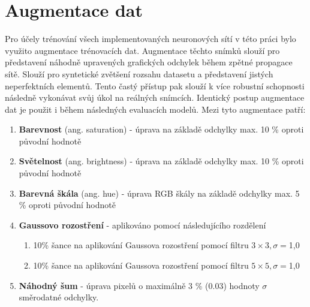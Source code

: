 \section{Augmentace dat}
\label{sec:Chapter41}
Pro účely trénování všech implementovaných neuronových sítí v této práci bylo využito augmentace trénovacích dat. Augmentace těchto snímků slouží pro představení náhodně upravených grafických odchylek během zpětné propagace sítě. Slouží pro syntetické zvětšení rozsahu datasetu a představení jistých neperfektních elementů. Tento častý přístup pak slouží k více robustní schopnosti následně vykonávat svůj úkol na reálných snímcích. Identický postup augmentace dat je použit i během následných evaluacích modelů. Mezi tyto augmentace patří:
\begin{enumerate}
  \item \textbf{Barevnost} (ang. saturation) - úprava na základě odchylky max. 10 \% oproti původní hodnotě
  \item \textbf{Světelnost} (ang. brightness) - úprava na základě odchylky max. 10 \% oproti původní hodnotě
  \item \textbf{Barevná škála} (ang. hue) - úprava RGB škály na základě odchylky max. 5 \% oproti původní hodnotě
  \item \textbf{Gaussovo rozostření} - aplikováno pomocí následujícího rozdělení
  \begin{enumerate}
      \item 10\% šance na aplikování Gaussova rozostření pomocí filtru $3\times3, \sigma=$1,0
      \item 10\% šance na aplikování Gaussova rozostření pomocí filtru $5\times5, \sigma=$1,0
  \end{enumerate}
  \item \textbf{Náhodný šum} - úprava pixelů o maximálně 3 \% (0.03) hodnoty $\sigma$ směrodatné odchylky.
\end{enumerate}
\endinput